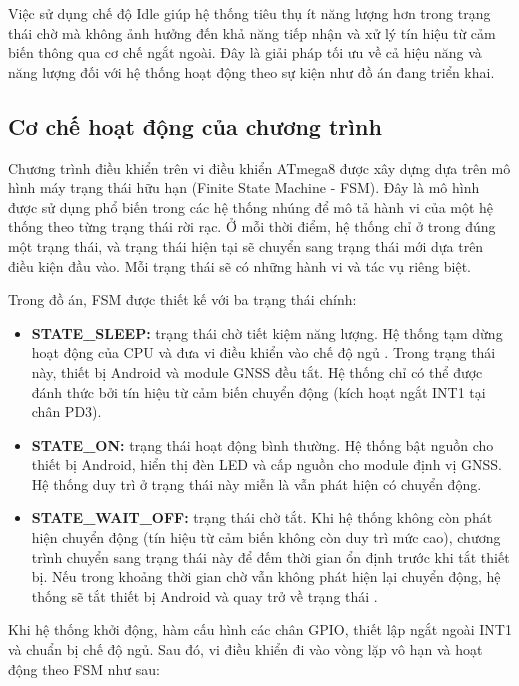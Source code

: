 \documentclass[../DoAn.tex]{subfiles}
\begin{document}
Việc sử dụng chế độ Idle giúp hệ thống tiêu thụ ít năng lượng hơn trong trạng thái chờ mà không ảnh hưởng đến khả năng tiếp nhận và xử lý tín hiệu từ cảm biến thông qua cơ chế ngắt ngoài. Đây là giải pháp tối ưu về cả hiệu năng và năng lượng đối với hệ thống hoạt động theo sự kiện như đồ án đang triển khai.

\subsection{Cơ chế hoạt động của chương trình}
\label{section:4.3.4}

Chương trình điều khiển trên vi điều khiển ATmega8 được xây dựng dựa trên mô hình máy trạng thái hữu hạn (Finite State Machine - FSM). Đây là mô hình được sử dụng phổ biến trong các hệ thống nhúng để mô tả hành vi của một hệ thống theo từng trạng thái rời rạc. Ở mỗi thời điểm, hệ thống chỉ ở trong đúng một trạng thái, và trạng thái hiện tại sẽ chuyển sang trạng thái mới dựa trên điều kiện đầu vào. Mỗi trạng thái sẽ có những hành vi và tác vụ riêng biệt.

Trong đồ án, FSM được thiết kế với ba trạng thái chính:

\begin{itemize}
    \item \textbf{STATE\_SLEEP:} trạng thái chờ tiết kiệm năng lượng. Hệ thống tạm dừng hoạt động của CPU và đưa vi điều khiển vào chế độ ngủ . Trong trạng thái này, thiết bị Android và module GNSS đều tắt. Hệ thống chỉ có thể được đánh thức bởi tín hiệu từ cảm biến chuyển động (kích hoạt ngắt INT1 tại chân PD3).
    
    \item \textbf{STATE\_ON:} trạng thái hoạt động bình thường. Hệ thống bật nguồn cho thiết bị Android, hiển thị đèn LED và cấp nguồn cho module định vị GNSS. Hệ thống duy trì ở trạng thái này miễn là vẫn phát hiện có chuyển động.

    \item \textbf{STATE\_WAIT\_OFF:} trạng thái chờ tắt. Khi hệ thống không còn phát hiện chuyển động (tín hiệu từ cảm biến không còn duy trì mức cao), chương trình chuyển sang trạng thái này để đếm thời gian ổn định trước khi tắt thiết bị. Nếu trong khoảng thời gian chờ vẫn không phát hiện lại chuyển động, hệ thống sẽ tắt thiết bị Android và quay trở về trạng thái .
\end{itemize}

Khi hệ thống khởi động, hàm  cấu hình các chân GPIO,  thiết lập ngắt ngoài INT1 và  chuẩn bị chế độ ngủ. Sau đó, vi điều khiển đi vào vòng lặp vô hạn và hoạt động theo FSM như sau:
\end{document}
